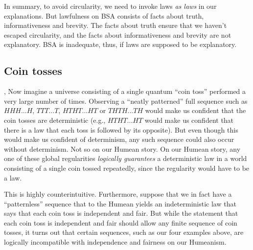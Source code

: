 In summary, to avoid circularity, we need to invoke laws \textit{as laws} in our explanations. But lawfulness on BSA consists
of facts about truth, informativeness and brevity. The facts about truth ensure that we haven't escaped circularity, and the
facts about informativeness and brevity are not explanatory. BSA is inadequate, thus, if laws are supposed to be explanatory.

\subsection{Coin tosses},
Now imagine a universe consisting of a single quantum ``coin toss'' performed a very large number of times. Observing 
a ``neatly patterned'' full sequence such as $HHH...H$, $TTT...T$, $HTHT...HT$ or $THTH...TH$ would make us confident 
that the coin tosses are deterministic (e.g., $HTHT...HT$
would make us confident that there is a law that each toss is followed by its opposite). But even though this would make us confident of determinism, any such sequence could also
occur without determinism. Not so on our Humean story. On our Humean story, any one of these global regularities \textit{logically 
guarantees} a deterministic law in a world consisting of a single coin tossed repeatedly, since the regularity would
have to be a law. 

This is highly counterintuitive. 
Furthermore, suppose that we in fact have a ``patternless'' sequence that to the Humean yields an indeterministic law that says 
that each coin toss is independent and fair. But while the statement that each coin toss is independent and fair should allow any 
finite sequence of coin tosses, it turns out that certain sequences, such as our four examples above, are logically incompatible with 
independence and fairness on our Humeanism.

